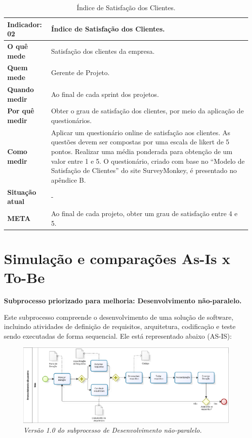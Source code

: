 \begin{table}[H]
\caption{Índice de Satisfação dos Clientes.}
\centering
\begin{tabular}{ | p{3cm} | p{9cm}| }
\hline
\textbf{Indicador: 02} & Índice de Satisfação dos Clientes.\\ \hline
\textbf{O quê mede} & Satisfação dos clientes da empresa. \\ \hline
\textbf{Quem mede} & Gerente de Projeto. \\ \hline
\textbf{Quando medir} & Ao final de cada sprint dos projetos. \\ \hline
\textbf{Por quê medir} & Obter o grau de satisfação dos clientes, por meio da aplicação de questionários. \\ \hline
\textbf{Como medir} & Aplicar um questionário online de satisfação aos clientes. As questões devem ser compostas por uma escala de likert de 5 pontos. Realizar uma média ponderada para obtenção de um valor entre 1 e 5.
O questionário, criado com base no “Modelo de Satisfação de Clientes” do site SurveyMonkey, é presentado no apêndice B. \\ \hline
\textbf{Situação atual} & - \\ \hline
\textbf{META} & Ao final de cada projeto, obter um grau de satisfação entre 4 e 5. \\ \hline
\end{tabular}
\end{table}

\section{Simulação e comparações As-Is x To-Be}
\textbf{Subprocesso priorizado para melhoria: Desenvolvimento não-paralelo.}

Este subprocesso compreende o desenvolvimento de uma solução de software, incluindo atividades de definição de requisitos, arquitetura, codificação e teste sendo executadas de forma sequencial. Ele está representado abaixo (AS-IS):

\begin{figure}[H]
\centering\includegraphics[scale=0.3]{figuras/asIs.png}
\caption{\textit{Versão 1.0 do subprocesso de Desenvolvimento não-paralelo.}}
\end{figure}

